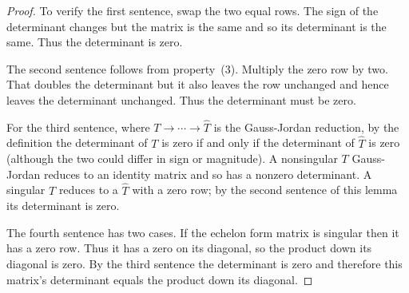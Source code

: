 \begin{proof}
To verify the first sentence, swap the two equal rows.
The sign of the determinant changes but the matrix is the same
and so its determinant is the same.
Thus the determinant is zero.

The second sentence follows from property~(3).
Multiply the zero row by two.
That doubles the determinant but it also
leaves the row unchanged and hence 
leaves the determinant unchanged. 
Thus the determinant must be zero.

For the third sentence, 
where $T \rightarrow\cdots\rightarrow\hat{T}$ is the
Gauss-Jordan reduction, by the definition
the determinant of $T$ is zero if and only if
the determinant of $\hat{T}$ is zero
(although the two could differ in sign or magnitude).
A nonsingular $T$ Gauss-Jordan reduces to an identity matrix
and so has a nonzero determinant.
A singular $T$ reduces to a $\hat{T}$ with a zero row;
by the second sentence of this lemma its determinant is zero.

The fourth sentence has two cases.
If the echelon form matrix is singular then
it has a zero row.
Thus it has a zero on its diagonal, so
the product down its diagonal is zero.
By the third sentence the determinant is zero and
therefore this matrix's determinant equals the
product down its diagonal.


\end{proof}
